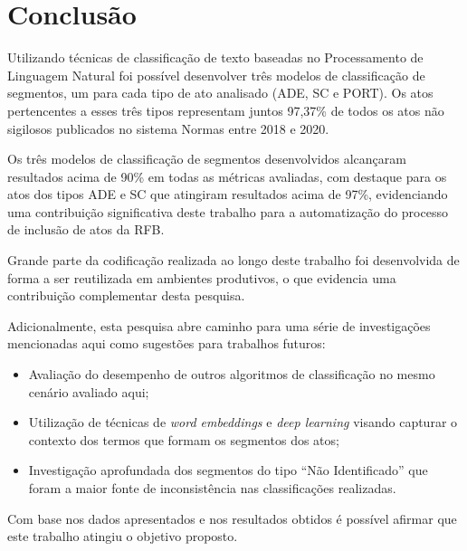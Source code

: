 \section{Conclusão}

Utilizando técnicas de classificação de texto baseadas no Processamento de Linguagem Natural foi possível desenvolver três modelos de classificação de segmentos, um para cada tipo de ato analisado (ADE, SC e PORT). Os atos pertencentes a esses três tipos representam juntos 97,37\% de todos os atos não sigilosos publicados no sistema Normas entre 2018 e 2020.

Os três modelos de classificação de segmentos desenvolvidos alcançaram resultados acima de 90\% em todas as métricas avaliadas, com destaque para os atos dos tipos ADE e SC que atingiram resultados acima de 97\%, evidenciando uma contribuição significativa deste trabalho para a automatização do processo de inclusão de atos da RFB.

Grande parte da codificação realizada ao longo deste trabalho foi desenvolvida de forma a ser reutilizada em ambientes produtivos, o que evidencia uma contribuição complementar desta pesquisa.

Adicionalmente, esta pesquisa abre caminho para uma série de investigações mencionadas aqui como sugestões para trabalhos futuros: 
\begin{itemize}
	\item Avaliação do desempenho de outros algoritmos de classificação no mesmo cenário avaliado aqui;
	\item Utilização de técnicas de \textit{word embeddings} e \textit{deep learning} visando capturar o contexto dos termos que formam os segmentos dos atos;
	\item Investigação aprofundada dos segmentos do tipo ``Não Identificado'' que foram a maior fonte de inconsistência nas classificações realizadas.
\end{itemize}

Com base nos dados apresentados e nos resultados obtidos é possível afirmar que este trabalho atingiu o objetivo proposto.


\begin{figure}
\label{fig:fake}
\end{figure}